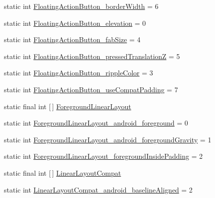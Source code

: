 \begin{DoxyCompactItemize}
\item 
static int \hyperlink{classandroid_1_1support_1_1v7_1_1cardview_1_1R_1_1styleable_a6ade0c9a91640786d052b5ce9007367a}{Floating\+Action\+Button\+\_\+border\+Width} = 6
\item 
static int \hyperlink{classandroid_1_1support_1_1v7_1_1cardview_1_1R_1_1styleable_a477d324687e0fa87caccb4664d67dbc8}{Floating\+Action\+Button\+\_\+elevation} = 0
\item 
static int \hyperlink{classandroid_1_1support_1_1v7_1_1cardview_1_1R_1_1styleable_affce83fe036d64bf069fab004a29b09a}{Floating\+Action\+Button\+\_\+fab\+Size} = 4
\item 
static int \hyperlink{classandroid_1_1support_1_1v7_1_1cardview_1_1R_1_1styleable_a8529a0b7a3336b9f9172273795f573f5}{Floating\+Action\+Button\+\_\+pressed\+TranslationZ} = 5
\item 
static int \hyperlink{classandroid_1_1support_1_1v7_1_1cardview_1_1R_1_1styleable_aba4e7e7c1ea8caf0dd310ef0ad576337}{Floating\+Action\+Button\+\_\+ripple\+Color} = 3
\item 
static int \hyperlink{classandroid_1_1support_1_1v7_1_1cardview_1_1R_1_1styleable_a8651097694af5cd9a96507bdc22abdcb}{Floating\+Action\+Button\+\_\+use\+Compat\+Padding} = 7
\item 
static final int \mbox{[}$\,$\mbox{]} \hyperlink{classandroid_1_1support_1_1v7_1_1cardview_1_1R_1_1styleable_af65f6d907ddde9ba2d4a7f06cb3facc1}{Foreground\+Linear\+Layout}
\item 
static int \hyperlink{classandroid_1_1support_1_1v7_1_1cardview_1_1R_1_1styleable_a7860635900d3f599a2dfa065f5776024}{Foreground\+Linear\+Layout\+\_\+android\+\_\+foreground} = 0
\item 
static int \hyperlink{classandroid_1_1support_1_1v7_1_1cardview_1_1R_1_1styleable_a390c7059f019cf363c6effe51768a963}{Foreground\+Linear\+Layout\+\_\+android\+\_\+foreground\+Gravity} = 1
\item 
static int \hyperlink{classandroid_1_1support_1_1v7_1_1cardview_1_1R_1_1styleable_af51ca6078731d0a8972be1e77125aff8}{Foreground\+Linear\+Layout\+\_\+foreground\+Inside\+Padding} = 2
\item 
static final int \mbox{[}$\,$\mbox{]} \hyperlink{classandroid_1_1support_1_1v7_1_1cardview_1_1R_1_1styleable_a700813433e97ff82dc1f2263b2072586}{Linear\+Layout\+Compat}
\item 
static int \hyperlink{classandroid_1_1support_1_1v7_1_1cardview_1_1R_1_1styleable_ae586b23df4ea32887555ce78f3325c2c}{Linear\+Layout\+Compat\+\_\+android\+\_\+baseline\+Aligned} = 2

\end{DoxyCompactItemize}
